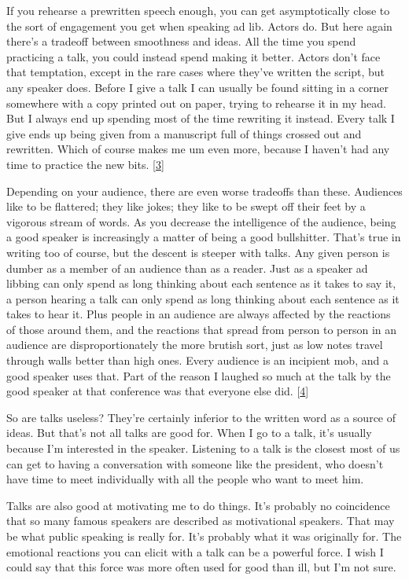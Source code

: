 If you rehearse a prewritten speech enough, you can get asymptotically
close to the sort of engagement you get when speaking ad lib. Actors do.
But here again there's a tradeoff between smoothness and ideas. All the
time you spend practicing a talk, you could instead spend making it
better. Actors don't face that temptation, except in the rare cases
where they've written the script, but any speaker does. Before I give a
talk I can usually be found sitting in a corner somewhere with a copy
printed out on paper, trying to rehearse it in my head. But I always end
up spending most of the time rewriting it instead. Every talk I give
ends up being given from a manuscript full of things crossed out and
rewritten. Which of course makes me um even more, because I haven't had
any time to practice the new bits. {[}\hyperref[f3n]{3}{]}

Depending on your audience, there are even worse tradeoffs than these.
Audiences like to be flattered; they like jokes; they like to be swept
off their feet by a vigorous stream of words. As you decrease the
intelligence of the audience, being a good speaker is increasingly a
matter of being a good bullshitter. That's true in writing too of
course, but the descent is steeper with talks. Any given person is
dumber as a member of an audience than as a reader. Just as a speaker ad
libbing can only spend as long thinking about each sentence as it takes
to say it, a person hearing a talk can only spend as long thinking about
each sentence as it takes to hear it. Plus people in an audience are
always affected by the reactions of those around them, and the reactions
that spread from person to person in an audience are disproportionately
the more brutish sort, just as low notes travel through walls better
than high ones. Every audience is an incipient mob, and a good speaker
uses that. Part of the reason I laughed so much at the talk by the good
speaker at that conference was that everyone else did.
{[}\hyperref[f4n]{4}{]}

So are talks useless? They're certainly inferior to the written word as
a source of ideas. But that's not all talks are good for. When I go to a
talk, it's usually because I'm interested in the speaker. Listening to a
talk is the closest most of us can get to having a conversation with
someone like the president, who doesn't have time to meet individually
with all the people who want to meet him.

Talks are also good at motivating me to do things. It's probably no
coincidence that so many famous speakers are described as motivational
speakers. That may be what public speaking is really for. It's probably
what it was originally for. The emotional reactions you can elicit with
a talk can be a powerful force. I wish I could say that this force was
more often used for good than ill, but I'm not sure.


